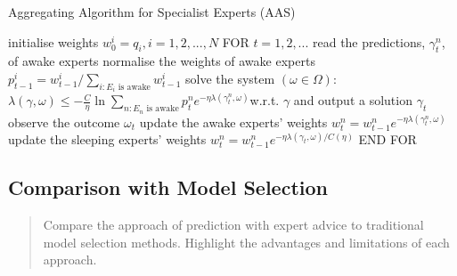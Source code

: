 \documentclass[11pt]{article} %
\theoremstyle{plain}
\theoremstyle{definition}
\begin{document}
\begin{algorithm}
  \caption{Aggregating Algorithm for Specialist Experts (AAS)}\label{alg:cap}
  \begin{algorithmic}[1]
    \State initialise weights $w^i_0 = q_i, i = 1, 2, ..., N$
    \State FOR $t = 1, 2, ...$
    \State \hspace{\algorithmicindent} read the predictions, $\gamma^n_t$, of awake experts
    \State \hspace{\algorithmicindent} normalise the weights of awake experts\newline\hspace*{\algorithmicindent}\hspace{\algorithmicindent} $p^i_{t-1} = w^i_{t-1} / \sum_{i:E_i\text{ is awake}} w^i_{t-1}$
    \State \hspace{\algorithmicindent} solve the system $(\omega \in \Omega):$\newline\hspace*{\algorithmicindent}\hspace{\algorithmicindent}$\lambda(\gamma, \omega) \leq - \frac{C}{\eta} \ln \sum_{n:E_n\text{ is awake}}p^n_{t}e^{-\eta\lambda(\gamma^n_t, \omega)}$\newline\hspace*{\algorithmicindent}\hspace{\algorithmicindent}w.r.t. $\gamma$ and output a solution $\gamma_t$
    \State \hspace{\algorithmicindent} observe the outcome $\omega_t$
    \State \hspace{\algorithmicindent} update the awake experts' weights $w^n_t = w^n_{t-1}e^{-\eta\lambda(\gamma^n_t,\omega)}$
    \State \hspace{\algorithmicindent} update the sleeping experts' weights $w^n_t = w^n_{t-1} e^{-\eta\lambda(\gamma_t, \omega)/C(\eta)}$
    \State END FOR
  \end{algorithmic}
\end{algorithm}


\subsection{Comparison with Model Selection}
\begin{quote}
  Compare the approach of prediction with expert advice to traditional model selection methods. Highlight the advantages and limitations of each approach.
\end{quote}

\newpage



\end{document}
